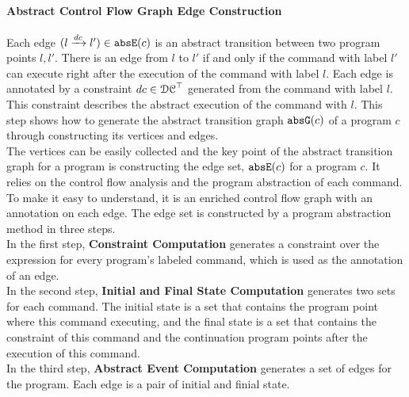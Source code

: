 \paragraph{Abstract Control Flow Graph Edge Construction}
\label{sec:abscfg-edge}
Each edge $(l \xrightarrow{dc} l') \in \mathtt{abs}{\mathtt{E}}(c)$ is an abstract transition
between two program points $l, l'$. 
There is an edge from $l$ to $l'$ if and only if
the command with label $l'$ can execute right after the execution of the command with label $l$.
Each edge is annotated by a constraint $dc \in \mathcal{DC}^{\top}$ generated from the command with label $l$.
This constraint describes the abstract execution of the command with $l$. 
This step shows how to generate the abstract transition graph $\mathtt{abs}{\mathtt{G}}(c)$ of a
program $c$ through constructing its vertices and edges.
\\
  The vertices can be easily collected and the key point of the abstract
  transition graph for a program is constructing the edge set, $\mathtt{abs}{\mathtt{E}}(c)$ for a program $c$.
  It relies on the control flow analysis and the program abstraction of each command.
  To make it easy to understand, it
  is an enriched control flow graph with an annotation on each edge.
  The edge set is constructed by a program abstraction method in three steps.
  \\
  In the first step, \textbf{Constraint Computation} generates a constraint
  over the expression for every program's labeled command,
  which is used as the annotation of an edge.
  \\
  In the second step, \textbf{Initial and Final State Computation} generates two sets for each command. 
  The initial state is a set that contains the
  program point where this command  executing, 
  and the final state is a set
  that contains the constraint of this command
  and the continuation program points after the execution of this command.
  \\ 
  In the third step, \textbf{Abstract Event Computation} generates a set of edges for the program.
  Each edge is a pair of initial and finial state.
%
